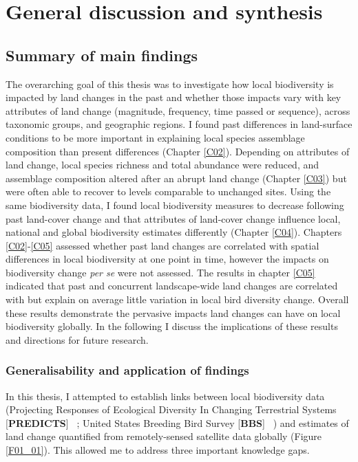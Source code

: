 \chapter{General discussion and synthesis}
\label{C06}

\section{Summary of main findings}
\label{C06_01}

The overarching goal of this thesis was to investigate how local biodiversity is impacted by land changes in the past and whether those impacts vary with key attributes of land change (\eg magnitude, frequency, time passed or sequence), across taxonomic groups, and geographic regions. I found past differences in land-surface conditions to be more important in explaining local species assemblage composition than present differences (Chapter \ref{C02}). Depending on attributes of land change, local species richness and total abundance were reduced, and assemblage composition altered after an abrupt land change (Chapter \ref{C03}) but were often able to recover to levels comparable to unchanged sites. Using the same biodiversity data, I found local biodiversity measures to decrease following past land-cover change and that attributes of land-cover change influence local, national and global biodiversity estimates differently (Chapter \ref{C04}). Chapters \ref{C02}-\ref{C05} assessed whether past land changes are correlated with spatial differences in local biodiversity at one point in time, however the impacts on biodiversity change \textit{per se} were not assessed. The results in chapter \ref{C05} indicated that past and concurrent landscape-wide land changes are correlated with but explain on average little variation in local bird diversity change. Overall these results demonstrate the pervasive impacts land changes can have on local biodiversity globally. In the following I discuss the implications of these results and directions for future research.

\subsection{Generalisability and application of findings}
\label{C06_0101}

In this thesis, I attempted to establish links between local biodiversity data (Projecting Responses of Ecological Diversity In Changing Terrestrial Systems [\textbf{PREDICTS}] \textendash\ \cite{Hudson2016}; United States Breeding Bird Survey [\textbf{BBS}] \textendash\ \cite{Pardieck2018}) and estimates of land change quantified from remotely-sensed satellite data globally (Figure \ref{F01_01}). This allowed me to address three important knowledge gaps.

